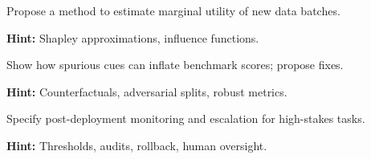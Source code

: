 \begin{problem}
Propose a method to estimate marginal utility of new data batches.

\textbf{Hint:} Shapley approximations, influence functions.
\end{problem}

\begin{problem}
Show how spurious cues can inflate benchmark scores; propose fixes.

\textbf{Hint:} Counterfactuals, adversarial splits, robust metrics.
\end{problem}

\begin{problem}
Specify post-deployment monitoring and escalation for high-stakes tasks.

\textbf{Hint:} Thresholds, audits, rollback, human oversight.
\end{problem}


